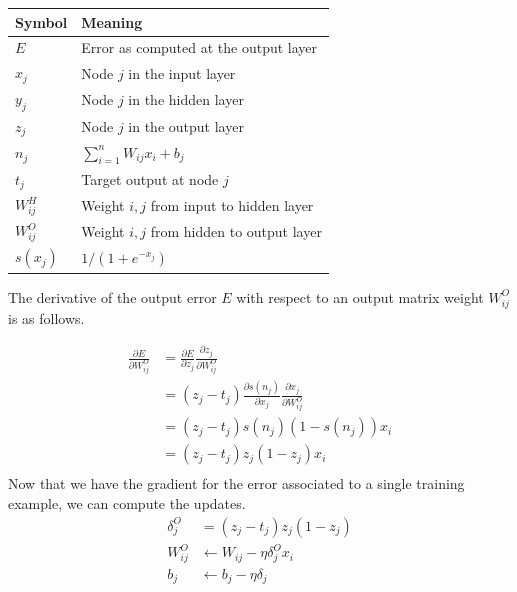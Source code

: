 \documentclass[conference]{IEEEtran}
\begin{document}
\begin{table}[h]
\normalsize
\begin{tabular}{l|l}
Symbol     & Meaning                                                          \\ \hline
$E$          & Error as computed at the output layer                            \\
$x_j$       & Node $j$ in the input layer                                      \\
$y_j$       & Node $j$ in the hidden layer                                     \\
$z_j$       & Node $j$ in the output layer                                     \\
$n_j$       & $\sum_{i=1}^n W_{ij}x_i + b_j$                                   \\
$t_j$       & Target output at node $j$                                   \\
$W_{ij}^H$ & Weight $i,j$ from input to hidden layer \\
$W_{ij}^O$ & Weight $i,j$ from hidden to output layer \\
$s(x_j)$    & $1/(1+e^{-x_j})$                                                 
\end{tabular}
\end{table}

The derivative of the output error $E$ with respect to an output matrix weight $W_{ij}^O$ is as follows.

\begin{equation}
\begin{split}
\frac{\partial E}{\partial W^O_{ij}} &= \frac{\partial E}{\partial z_j}\frac{\partial z_j}{\partial W^O_{ij}} \\
																	 &=(z_j - t_j)\frac{\partial s(n_j)}{\partial x_j}\frac{\partial x_j}{\partial W^O_{ij}} \\
																	 &=(z_j-t_j)s(n_j)(1-s(n_j))x_i \\
																	 &=(z_j-t_j)z_j(1-z_j)x_i \\
\end{split}
\label{}
\end{equation}
Now that we have the gradient for the error associated to a single training example, we can compute the updates.
\begin{equation}
\begin{split}
\delta^O_j &= (z_j-t_j)z_j(1-z_j) \\
W^O_{ij} &\leftarrow W_{ij} - \eta \delta^O_j x_i \\
b_j &\leftarrow b_j - \eta\delta_j
\end{split}
\end{equation}
\end{document}
